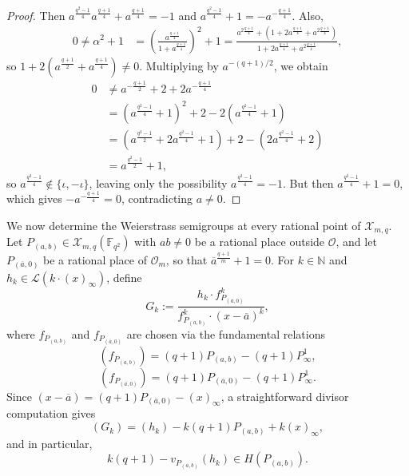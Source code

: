 \documentclass[12pt]{amsart}
\theoremstyle{remark}
\theoremstyle{definition}
\newcommand{\coloneqq}{\mathrel{:=}}
\begin{document}
\begin{proof}
    Then
    $a^{\frac{q^{2}-1}{4}} a^{\frac{q+1}{4}} + a^{\frac{q+1}{4}} = -1$
    and $a^{\frac{q^{2}-1}{4}} + 1 = -a^{-\frac{q+1}{4}}$. Also,
    \begin{align*}
        0 \neq \alpha^{2} + 1
        &= \left(\frac{a^{\frac{q+1}{4}}}{1+a^{\frac{q+1}{4}}}\right)^{2} + 1
         = \frac{a^{2\frac{q+1}{4}}
                 + \left(1 + 2a^{\frac{q+1}{4}} + a^{2\frac{q+1}{4}}\right)}
                {1 + 2a^{\frac{q+1}{4}} + a^{2\frac{q+1}{4}}},
    \end{align*}
    so $1 + 2(a^{\frac{q+1}{2}} + a^{\frac{q+1}{4}}) \neq 0$. Multiplying by
    $a^{-(q+1)/2}$, we obtain
    \begin{align*}
        0 &\neq a^{-\frac{q+1}{2}} + 2 + 2a^{-\frac{q+1}{4}} \\
          &= \left(a^{\frac{q^{2}-1}{4}} + 1\right)^{2}
             + 2 - 2\left(a^{\frac{q^{2}-1}{4}} + 1\right) \\
          &= \left(a^{\frac{q^{2}-1}{2}} + 2a^{\frac{q^{2}-1}{4}} + 1\right)
             + 2 - \left(2a^{\frac{q^{2}-1}{4}} + 2\right) \\
          &= a^{\frac{q^{2}-1}{2}} + 1,
    \end{align*}
    so $a^{\frac{q^{2}-1}{4}} \notin \{\iota, -\iota\}$, leaving only the
    possibility $a^{\frac{q^{2}-1}{4}} = -1$. But then
    $a^{\frac{q^{2}-1}{4}} + 1 = 0$, which gives
    $-a^{-\frac{q+1}{4}} = 0$, contradicting $a \neq 0$.
\end{proof}

We now determine the Weierstrass semigroups at every rational point of 
$\mathcal{X}_{m,q}$. Let $P_{(a,b)} \in \mathcal{X}_{m,q}(\mathbb{F}_{q^2})$ 
with $ab \neq 0$ be a rational place outside $\mathcal{O}$, and let 
$P_{(\overline{a},0)}$ be a rational place of $\mathcal{O}_m$, so that 
$\overline{a}^{\frac{q+1}{m}} + 1 = 0$. For $k \in \mathbb{N}$ and 
$h_k \in \mathcal{L}(k \cdot (x)_\infty)$, define
\begin{equation}\label{div-Gk}
    G_k \coloneqq \frac{h_k \cdot f_{P_{(\overline{a},0)}}^k}
    {f_{P_{(a,b)}}^k \cdot (x - \overline{a})^k},
\end{equation}
where $f_{P_{(a,b)}}$ and $f_{P_{(\overline{a},0)}}$ are chosen via the 
fundamental relations
\[
    (f_{P_{(a,b)}}) = (q+1)P_{(a,b)} - (q+1)P_\infty^1,
\]
\[
    (f_{P_{(\overline{a},0)}}) = (q+1)P_{(\overline{a},0)} - (q+1)P_\infty^1.
\]
Since $(x - \overline{a}) = (q+1)P_{(\overline{a},0)} - (x)_\infty$, a 
straightforward divisor computation gives
\[
    (G_k) = (h_k) - k(q+1)P_{(a,b)} + k(x)_\infty,
\]
and in particular,
\[
    k(q+1) - v_{P_{(a,b)}}(h_k) \in H(P_{(a,b)}).
\]
\end{document}
